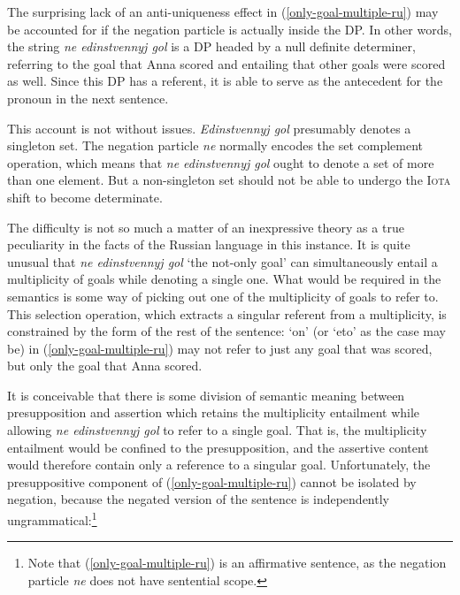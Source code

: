 \documentclass{article}
\begin{document}
The surprising lack of an anti-uniqueness effect in (\ref{only-goal-multiple-ru}) may be accounted for if the negation particle is actually inside the DP. In other words, the string \textit{ne edinstvennyj gol} is a DP headed by a null definite determiner, referring to the goal that Anna scored and entailing that other goals were scored as well. Since this DP has a referent, it is able to serve as the antecedent for the pronoun in the next sentence.

This account is not without issues. \textit{Edinstvennyj gol} presumably denotes a singleton set. The negation particle \textit{ne} normally encodes the set complement operation, which means that \textit{ne edinstvennyj gol} ought to denote a set of more than one element. But a non-singleton set should not be able to undergo the \textsc{Iota} shift to become determinate.

The difficulty is not so much a matter of an inexpressive theory as a true peculiarity in the facts of the Russian language in this instance. It is quite unusual that \textit{ne edinstvennyj gol} `the not-only goal' can simultaneously entail a multiplicity of goals while denoting a single one. What would be required in the semantics is some way of picking out one of the multiplicity of goals to refer to. This selection operation, which extracts a singular referent from a multiplicity, is constrained by the form of the rest of the sentence: `on' (or `eto' as the case may be) in (\ref{only-goal-multiple-ru}) may not refer to just any goal that was scored, but only the goal that Anna scored.

It is conceivable that there is some division of semantic meaning between presupposition and assertion which retains the multiplicity entailment while allowing \textit{ne edinstvennyj gol} to refer to a single goal. That is, the multiplicity entailment would be confined to the presupposition, and the assertive content would therefore contain only a reference to a singular goal. Unfortunately, the presuppositive component of (\ref{only-goal-multiple-ru}) cannot be isolated by negation, because the negated version of the sentence is independently ungrammatical:\footnote{Note that (\ref{only-goal-multiple-ru}) is an affirmative sentence, as the negation particle \textit{ne} does not have sentential scope.}

\begin{exe}
\end{exe}
\end{document}
